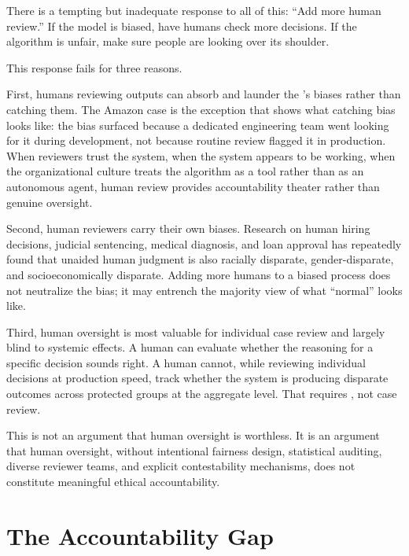 There is a tempting but inadequate response to all of this: ``Add more human review.'' If the model is biased, have humans check more decisions. If the algorithm is unfair, make sure people are looking over its shoulder.

This response fails for three reasons.

First, humans reviewing \ai outputs can absorb and launder the \ai's biases rather than catching them. The Amazon case is the exception that shows what catching bias looks like: the bias surfaced because a dedicated engineering team went looking for it during development, not because routine review flagged it in production. When reviewers trust the system, when the system appears to be working, when the organizational culture treats the algorithm as a tool rather than as an autonomous agent, human review provides accountability theater rather than genuine oversight.

Second, human reviewers carry their own biases. Research on human hiring decisions, judicial sentencing, medical diagnosis, and loan approval has repeatedly found that unaided human judgment is also racially disparate, gender-disparate, and socioeconomically disparate. Adding more humans to a biased process does not neutralize the bias; it may entrench the majority view of what ``normal'' looks like.

Third, human oversight is most valuable for individual case review and largely blind to systemic effects. A human can evaluate whether the reasoning for a specific decision sounds right. A human cannot, while reviewing individual decisions at production speed, track whether the system is producing disparate outcomes across protected groups at the aggregate level. That requires , not case review.

This is not an argument that human oversight is worthless. It is an argument that human oversight, without intentional fairness design, statistical auditing, diverse reviewer teams, and explicit contestability mechanisms, does not constitute meaningful ethical accountability.

\section{The Accountability Gap}
\label{sec:ch14-accountability}

